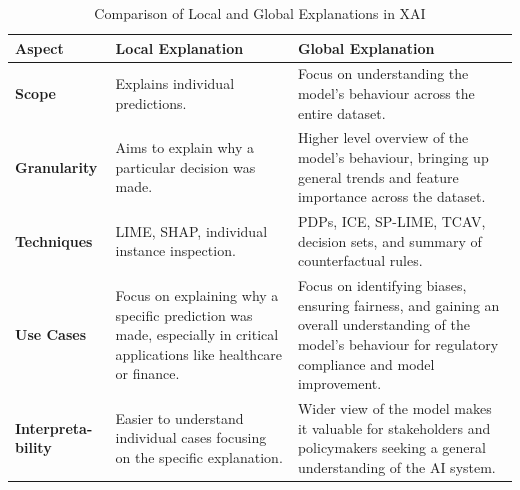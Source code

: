 \documentclass[10pt,journal,compsoc]{IEEEtran}
\begin{document}
\begin{table}[h]
    \centering
    \small
    \begin{tabularx}{\columnwidth}{|p{1.8cm}|X|X|}
        \hline
        \textbf{Aspect}           & \textbf{Local Explanation}                                                                                              & \textbf{Global Explanation}                                                                                                                                    \\
        \hline
        \textbf{Scope}            & Explains individual predictions.                                                                                     & Focus on understanding the model's behaviour across the entire dataset.                                                                                \\
        \hline
        \textbf{Granularity}      & Aims to explain why a particular decision was made.                                                                     & Higher level overview of the model's behaviour, bringing up general trends and feature importance across the dataset.                                          \\
        \hline
        \textbf{Techniques}       & LIME, SHAP, individual instance inspection.                                                                             & PDPs, ICE, SP-LIME, TCAV, decision sets, and summary of counterfactual rules.\cite{phillips2020four}                                                               \\
        \hline
        \textbf{Use Cases}        & Focus on explaining why a specific prediction was made, especially in critical applications like healthcare or finance. & Focus on identifying biases, ensuring fairness, and gaining an overall understanding of the model's behaviour for regulatory compliance and model improvement. \\
        \hline
        \textbf{Interpreta-bility} & Easier to understand individual cases focusing on the specific explanation.                                        & Wider view of the model makes it valuable for stakeholders and policymakers seeking a general understanding of the AI system.                                \\
        \hline
    \end{tabularx}
    \caption{Comparison of Local and Global Explanations in XAI}
    \label{tab:xai_comparison}
\end{table}
\end{document}
